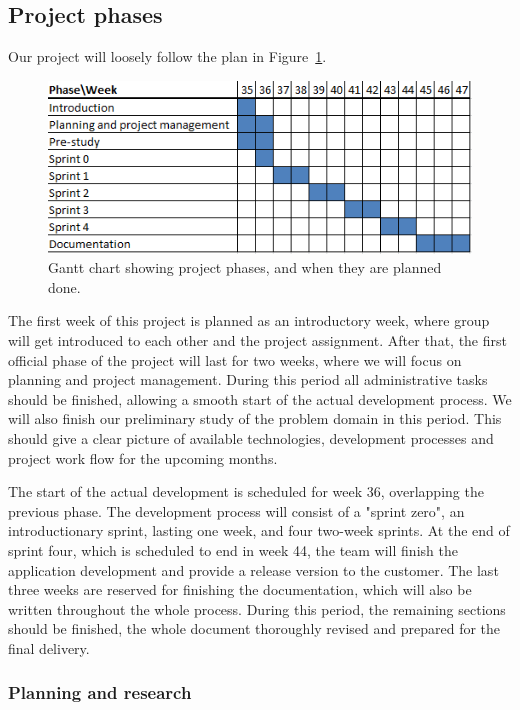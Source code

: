 \subsection{Project phases}
Our project will loosely follow the plan in Figure~\ref{gantt:project}.

\begin{figure}[h]
\centering
  \includegraphics[width=1.0\textwidth]{project_management/project_effort_estimation}
  \caption[Gantt chart of project phases]{Gantt chart showing project phases, and when they are planned done.}
  \label{gantt:project}
\end{figure}
The first week of this project is planned as an introductory week, where group
will get introduced to each other and the project assignment.  After that, the
first official phase of the project will last for two weeks, where we will focus
on planning and project management.  During this period all administrative tasks
should be finished, allowing a smooth start of the actual development process.
We will also finish our preliminary study of the problem domain in this period.
This should give a clear picture of available technologies, development
processes and project work flow for the upcoming months.

The start of the actual development is scheduled for week 36, overlapping the
previous phase.  The development process will consist of a "sprint zero", an
introductionary sprint, lasting one week, and four two-week sprints.  At the end
of sprint four, which is scheduled to end in  week 44, the team will finish the
application development and provide a release version to the customer.  The last
three weeks are reserved for finishing the documentation, which will also be
written throughout the whole process.  During this period, the remaining
sections should be finished, the whole document thoroughly revised and prepared
for the final delivery.

\subsubsection{Planning and research}

